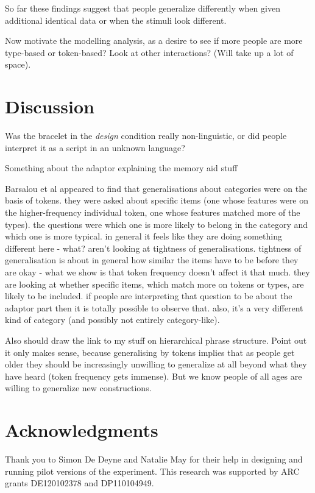\documentclass[10pt,letterpaper]{article}
\begin{document}
So far these findings suggest that people generalize differently when given additional identical data or when the stimuli look different.




Now motivate the modelling analysis, as a desire to see if more people are more type-based or token-based? Look at other interactions? (Will take up a lot of space).

\section{Discussion}

Was the bracelet in the {\it design} condition really non-linguistic, or did people interpret it as a script in an unknown language?

Something about the adaptor explaining the memory aid stuff

Barsalou et al appeared to find that generalisations about categories were on the basis of tokens. they were asked about specific items (one whose features were on the higher-frequency individual token, one whose features matched more of the types). the questions were which one is more likely to belong in the category and which one is more typical. 
     in general it feels like they are doing something different here - what? aren't looking at tightness of generalisations. tightness of generalisation is about in general how similar the items have to be before they are okay - what we show is that token frequency doesn't affect it that much. they are looking at whether specific items, which match more on tokens or types, are likely to be included. if people are interpreting that question to be about the adaptor part then it is totally possible to observe that.
    also, it's a very different kind of category (and possibly not entirely category-like).

Also should draw the link to my stuff on hierarchical phrase structure. Point out it only makes sense, because generalising by tokens implies that as people get older they should be increasingly unwilling to generalize at all beyond what they have heard (token frequency gets immense). But we know people of all ages are willing to generalize new constructions.

\small
\section{Acknowledgments}

Thank you to Simon De Deyne and Natalie May for their help in designing and running pilot versions of the experiment. This research was supported by ARC grants DE120102378 and DP110104949. 

\renewcommand{\bibliographytypesize}{\footnotesize}


\setlength{\bibleftmargin}{.125in}
\setlength{\bibindent}{-\bibleftmargin}



\end{document}

